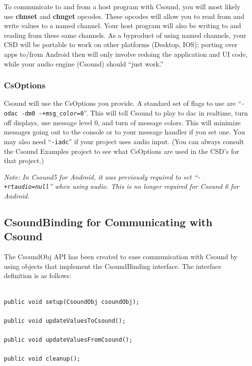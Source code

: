 \documentclass[11pt]{article}
\begin{document}
To communicate to and from a host program with Csound, you will most likely use \textbf{chnset} and \textbf{chnget} opcodes. These opcodes will allow you to read from and write values to a named channel.  Your host program will also be writing to and reading from these same channels.  As a byproduct of using named channels, your CSD will be portable to work on other platforms (Desktop, IOS); porting over apps to/from Android then will only involve redoing the application and UI code, while your audio engine (Csound) should ``just work.'' 

\subsubsection{CsOptions}

Csound will use the CsOptions you provide.  A standard set of flags to use are ``{\tt -odac -dm0 -+msg\_color=0}''. This will tell Csound to play to dac in realtime, turn off displays, use message level 0, and turn of message colors.  This will minimize messages going out to the console or to your message handler if you set one.  You may also need ``{\tt -iadc}'' if your project uses audio input. (You can always consult the Csound Examples project to see what CsOptions are used in the CSD's for that project.) 

\emph{Note: In Csound5 for Android, it was previously required to set \linebreak ``{\tt -+rtaudio=null}'' when using audio. This is no longer required for Csound 6 for Android.}
 

\subsection{CsoundBinding for Communicating with Csound}

The CsoundObj API has been created to ease communication with Csound by using objects that implement the CsoundBinding interface.  The interface definition is as follows:

\begin{lstlisting}[caption=CsoundBinding interface Definition]

public void setup(CsoundObj csoundObj);
	
public void updateValuesToCsound();
	
public void updateValuesFromCsound();
	
public void cleanup();

\end{lstlisting}
\end{document}
